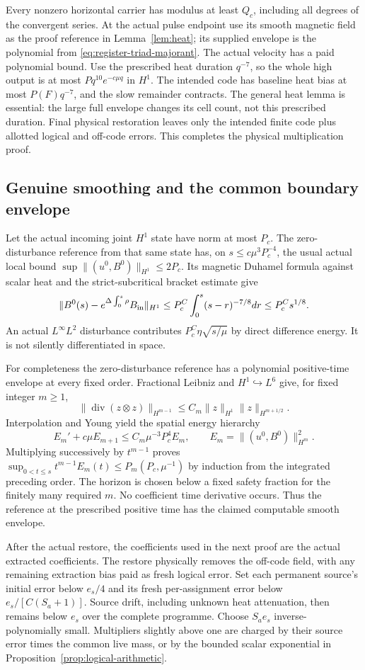 \documentclass[11pt,a4paper]{amsart}
\theoremstyle{definition}
\theoremstyle{remark}
\numberwithin{equation}{section}
\newcommand{\norm}[1]{\lVert #1\rVert}
\begin{document}
Every nonzero horizontal carrier has modulus at least $Q_c$, including
all degrees of the convergent series.  At the actual pulse endpoint
use its smooth magnetic field as the proof reference in
Lemma~\ref{lem:heat}; its supplied envelope is the polynomial from
\eqref{eq:register-triad-majorant}.  The actual velocity has a paid
polynomial bound.  Use the prescribed heat duration $q^{-7}$, so the
whole high output is at most $Pq^{10}e^{-c\mu q}$ in $H^1$.
The intended code has baseline heat bias at most $P(F)q^{-7}$, and
the slow remainder contracts.  The general heat lemma is essential:
the large full envelope changes its cell count, not this prescribed
duration.  Final physical restoration leaves only the intended finite
code plus allotted logical and off-code errors.  This completes the
physical multiplication proof.

\subsection{Genuine smoothing and the common boundary envelope}
Let the actual incoming joint $H^1$ state have norm at most $P_c$.
The zero-disturbance reference from that same state has, on
$s\le c\mu^3P_c^{-4}$, the usual actual local bound
$\sup\norm{(u^0,B^0)}_{H^1}\le2P_c$.
Its magnetic Duhamel formula against scalar heat and the strict-subcritical
bracket estimate give
\[
 \norm{B^0(s)-e^{\Delta\int_0^s\rho}B_{\rm in}}_{H^1}
       \le P_c^C\int_0^s(s-r)^{-7/8}dr
       \le P_c^Cs^{1/8}.
\]
An actual $L^\infty L^2$ disturbance contributes
$P_c^C\eta\sqrt{s/\mu}$ by direct difference energy.  It is not
silently differentiated in space.

For completeness the zero-disturbance reference has a polynomial
positive-time envelope at every fixed order.  Fractional Leibniz and
$H^1\hookrightarrow L^6$ give, for fixed integer $m\ge1$,
\[
 \norm{\operatorname{div}(z\otimes z)}_{H^{m-1}}
       \le C_m\norm z_{H^1}\norm z_{H^{m+1/2}}.
\]
Interpolation and Young yield the spatial energy hierarchy
\[
 E_m'+c\mu E_{m+1}\le C_m\mu^{-3}P_c^4E_m,
 \qquad E_m=\norm{(u^0,B^0)}_{H^m}^2.
\]
Multiplying successively by $t^{m-1}$ proves
$\sup_{0<t\le s}t^{m-1}E_m(t)\le P_m(P_c,\mu^{-1})$ by induction
from the integrated preceding order.  The horizon is chosen below a
fixed safety fraction for the finitely many required $m$.
No coefficient time derivative occurs.  Thus the reference at the
prescribed positive time has the claimed computable smooth envelope.

After the actual restore, the coefficients used in the next proof are
the actual extracted coefficients.  The restore physically removes the
off-code field, with any remaining extraction bias paid as fresh logical
error.  Set each permanent source's initial error below $e_s/4$ and its
fresh per-assignment error below $e_s/[C(S_a+1)]$.  Source drift, including
unknown heat attenuation, then remains below $e_s$ over the complete
programme.  Choose $S_ae_s$ inverse-polynomially small.  Multipliers
slightly above one are charged by their source error times the common
live mass, or by the bounded scalar exponential in
Proposition~\ref{prop:logical-arithmetic}.
\end{document}
